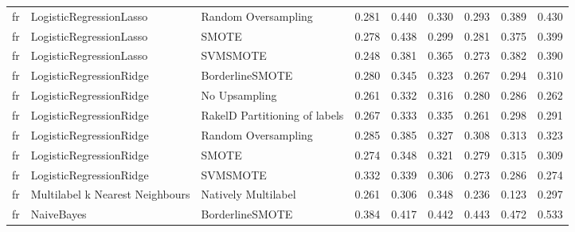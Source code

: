 \begin{tabular}{lllllllll}
      fr &         LogisticRegressionLasso &           Random Oversampling & 0.281 &                     0.440 &                 0.330 &                  0.293 &                                   0.389 &     0.430 \\
      fr &         LogisticRegressionLasso &                         SMOTE & 0.278 &                     0.438 &                 0.299 &                  0.281 &                                   0.375 &     0.399 \\
      fr &         LogisticRegressionLasso &                      SVMSMOTE & 0.248 &                     0.381 &                 0.365 &                  0.273 &                                   0.382 &     0.390 \\
      fr &         LogisticRegressionRidge &               BorderlineSMOTE & 0.280 &                     0.345 &                 0.323 &                  0.267 &                                   0.294 &     0.310 \\
      fr &         LogisticRegressionRidge &                 No Upsampling & 0.261 &                     0.332 &                 0.316 &                  0.280 &                                   0.286 &     0.262 \\
      fr &         LogisticRegressionRidge & RakelD Partitioning of labels & 0.267 &                     0.333 &                 0.335 &                  0.261 &                                   0.298 &     0.291 \\
      fr &         LogisticRegressionRidge &           Random Oversampling & 0.285 &                     0.385 &                 0.327 &                  0.308 &                                   0.313 &     0.323 \\
      fr &         LogisticRegressionRidge &                         SMOTE & 0.274 &                     0.348 &                 0.321 &                  0.279 &                                   0.315 &     0.309 \\
      fr &         LogisticRegressionRidge &                      SVMSMOTE & 0.332 &                     0.339 &                 0.306 &                  0.273 &                                   0.286 &     0.274 \\
      fr & Multilabel k Nearest Neighbours &           Natively Multilabel & 0.261 &                     0.306 &                 0.348 &                  0.236 &                                   0.123 &     0.297 \\
      fr &                      NaiveBayes &               BorderlineSMOTE & 0.384 &                     0.417 &                 0.442 &                  0.443 &                                   0.472 &     0.533 \\

\end{tabular}
